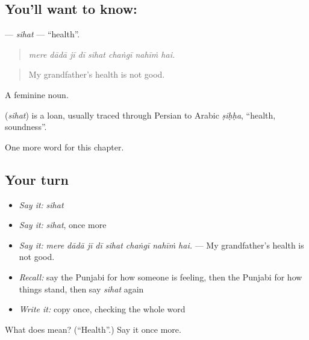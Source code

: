 \subsection*{You'll want to know: }
\textbf{} — \emph{sihat} — \textquotedblleft{}health\textquotedblright{}.

\begin{quote}
       
\end{quote}

\begin{quote}
\emph{mere dādā jī dī sihat chaṅgī nahīṁ hai.}
\end{quote}

\begin{quote}
My grandfather's health is not good.
\end{quote}

A feminine noun.

\begin{cousinweb}
\textbf{} (\emph{sihat}) is a loan, usually traced through Persian to Arabic \emph{ṣiḥḥa}, \textquotedblleft{}health, soundness\textquotedblright{}.
\end{cousinweb}

\begin{grammarlens}[title={What you've built}]
One more word for this chapter.
\end{grammarlens}

\subsection*{Your turn}
\begin{itemize}
\raggedright
  \item \emph{Say it:} \emph{sihat}
  \item \emph{Say it:} \emph{sihat}, once more
  \item \emph{Say it:} \emph{mere dādā jī dī sihat chaṅgī nahīṁ hai.} — My grandfather's health is not good.
  \item \emph{Recall:} say the Punjabi for how someone is feeling, then the Punjabi for how things stand, then say \emph{sihat} again
  \item \emph{Write it:} copy \textbf{} once, checking the whole word
\end{itemize}

\begin{tcolorbox}[breakable,colback=teal!4,colframe=teal!35!black,title={Before you move on}]
What does  mean? (\textquotedblleft{}Health\textquotedblright{}.) Say it once more.
\end{tcolorbox}
